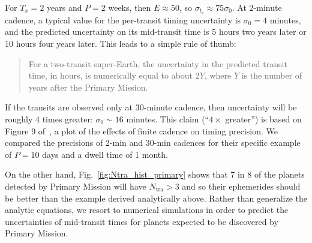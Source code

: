 For $T_x = 2$ years and $P = 2$ weeks, then $E \approx 50$, so $\sigma_{t_c}\approx 75\sigma_0$. 
At 2-minute cadence, a typical value for the per-transit timing uncertainty is $\sigma_0 = 4$ minutes, and the predicted uncertainty on its mid-transit time is 5 hours two years later or 10 hours four years later. This leads to a simple rule of thumb: %
\begin{quotation}
  For a two-transit super-Earth, the uncertainty in the predicted transit time, in hours, is numerically equal to about
  2$Y$, where $Y$ is the number of years after the Primary Mission.
\end{quotation}
If the transits are observed only at 30-minute cadence, then uncertainty will be roughly 4 times greater: $\sigma_0 \sim 16$ minutes. 
This claim (``$4\times$ greater'') is based on Figure 9 of~\citep{price_transit_2014}, a plot of the effects of finite cadence on timing precision. %
We compared the precisions of 2-min and 30-min cadences for their specific example of $P=10$ days and a dwell time of 1 month.

On the other hand, Fig.~\ref{fig:Ntra_hist_primary} shows that 7 in 8 of the planets detected by \tesss Primary Mission will have $N_\mathrm{tra}>3$ and so their ephemerides should be better than the example derived analytically above.
Rather than generalize the analytic equations, we resort to numerical simulations in order to predict the uncertainties of mid-transit times for planets expected to be discovered by \tesss Primary Mission.

